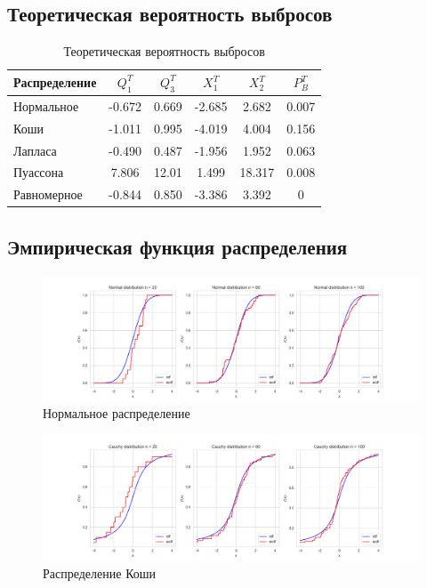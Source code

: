 \documentclass[a4paper,14pt]{article}
\begin{document}
	\subsection{Теоретическая вероятность выбросов}
	\begin{table}[H]
		\centering
		\begin{tabular}{|l|c|c|c|c|c|}
			\hline
			Распределение & $Q_1^T$	& $Q_3^T$ & $X_1^T$ & $X_2^T$ & $P_B^T$\\\hline
			\hline
			Нормальное & -0.672 & 0.669 & -2.685 & 2.682 & 0.007\\\hline
			Коши & -1.011 & 0.995 & -4.019 & 4.004 & 0.156\\\hline
			Лапласа & -0.490 & 0.487 & -1.956 & 1.952 & 0.063\\\hline
			Пуассона & 7.806 & 12.01 & 1.499 & 18.317 & 0.008\\\hline
			Равномерное & -0.844 & 0.850 & -3.386 & 3.392 & 0\\\hline
		\end{tabular}
		\caption{Теоретическая вероятность выбросов}
	\end{table}
	
	\subsection{Эмпирическая функция распределения}
	\begin{figure}[H]
		\centering
		\includegraphics[scale=0.48]{./lab1_4/pictures/Normal distribution100.png}
		\caption{Нормальное распределение}
	\end{figure}
	
	\begin{figure}[H]
		\centering
		\includegraphics[scale=0.48]{./lab1_4/pictures/Cauchy distribution100.png}
		\caption{Распределение Коши}
	\end{figure}
	
\end{document}
